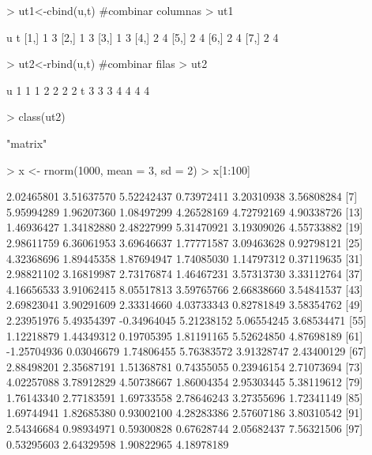 \documentclass[12pt]{article}
\begin{document}
\begin{Schunk}
\begin{Soutput}
\end{Soutput}
\begin{Sinput}
> ut1<-cbind(u,t) #combinar columnas
> ut1
\end{Sinput}
\begin{Soutput}
     u t
[1,] 1 3
[2,] 1 3
[3,] 1 3
[4,] 2 4
[5,] 2 4
[6,] 2 4
[7,] 2 4
\end{Soutput}
\begin{Sinput}
> ut2<-rbind(u,t) #combinar filas
> ut2
\end{Sinput}
\begin{Soutput}
  [,1] [,2] [,3] [,4] [,5] [,6] [,7]
u    1    1    1    2    2    2    2
t    3    3    3    4    4    4    4
\end{Soutput}
\begin{Sinput}
> class(ut2)
\end{Sinput}
\begin{Soutput}
[1] "matrix"
\end{Soutput}
\begin{Sinput}
> x <- rnorm(1000, mean = 3, sd = 2) 
> x[1:100]
\end{Sinput}
\begin{Soutput}
  [1]  2.02465801  3.51637570  5.52242437  0.73972411  3.20310938  3.56808284
  [7]  5.95994289  1.96207360  1.08497299  4.26528169  4.72792169  4.90338726
 [13]  1.46936427  1.34182880  2.48227999  5.31470921  3.19309026  4.55733882
 [19]  2.98611759  6.36061953  3.69646637  1.77771587  3.09463628  0.92798121
 [25]  4.32368696  1.89445358  1.87694947  1.74085030  1.14797312  0.37119635
 [31]  2.98821102  3.16819987  2.73176874  1.46467231  3.57313730  3.33112764
 [37]  4.16656533  3.91062415  8.05517813  3.59765766  2.66838660  3.54841537
 [43]  2.69823041  3.90291609  2.33314660  4.03733343  0.82781849  3.58354762
 [49]  2.23951976  5.49354397 -0.34964045  5.21238152  5.06554245  3.68534471
 [55]  1.12218879  1.44349312  0.19705395  1.81191165  5.52624850  4.87698189
 [61] -1.25704936  0.03046679  1.74806455  5.76383572  3.91328747  2.43400129
 [67]  2.88498201  2.35687191  1.51368781  0.74355055  0.23946154  2.71073694
 [73]  4.02257088  3.78912829  4.50738667  1.86004354  2.95303445  5.38119612
 [79]  1.76143340  2.77183591  1.69733558  2.78646243  3.27355696  1.72341149
 [85]  1.69744941  1.82685380  0.93002100  4.28283386  2.57607186  3.80310542
 [91]  2.54346684  0.98934971  0.59300828  0.67628744  2.05682437  7.56321506
 [97]  0.53295603  2.64329598  1.90822965  4.18978189
\end{Soutput}
\begin{Sinput}

\end{Sinput}
\end{Schunk}
\end{document}
